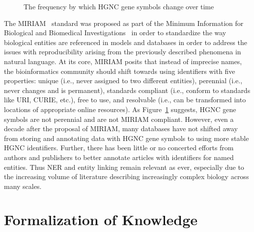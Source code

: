 \begin{figure}
    \captionsetup{format=plain}
    \caption[HGNC Gene Symbol Half Lives]{The frequency by which \ac{HGNC} gene symbols change over time}
    \label{fig:gene_symbol_half_life}
\end{figure}

The \ac{MIRIAM}~\cite{Laibe2007} standard was proposed as part of the Minimum Information for Biological and Biomedical Investigations~\cite{Taylor2008} in order to standardize the way biological entities are referenced in models and databases in order to address the issues with reproducibility arising from the previously described phenomena in natural language.
At its core, \ac{MIRIAM} posits that instead of imprecise names, the bioinformatics community should shift towards using identifiers with five properties: unique (i.e., never assigned to two different entities), perennial (i.e., never changes and is permanent), standards compliant (i.e., conform to standards like \ac{URI}, \ac{CURIE}, etc.), free to use, and resolvable (i.e., can be transformed into locations of appropriate online resources).
As Figure~\ref{fig:gene_symbol_half_life} suggests, \ac{HGNC} gene symbols are not perennial and are not \ac{MIRIAM} compliant.
However, even a decade after the proposal of \ac{MIRIAM}, many databases have not shifted away from storing and annotating data with \ac{HGNC} gene symbols to using more stable \ac{HGNC} identifiers.
Further, there has been little or no concerted efforts from authors and publishers to better annotate articles with identifiers for named entities.
Thus \ac{NER} and entity linking remain relevant as ever, especially due to the increasing volume of literature describing increasingly complex biology across many scales.

\section{Formalization of Knowledge}

